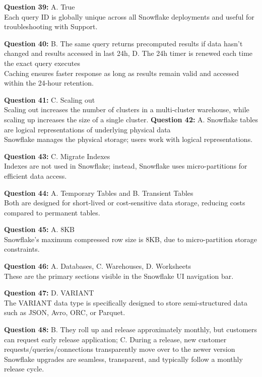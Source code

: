 \documentclass[12pt]{article}
\begin{document}
\textbf{Question 39:} A. True \\
Each query ID is globally unique across all Snowflake deployments and useful for troubleshooting with Support.

\textbf{Question 40:} B. The same query returns precomputed results if data hasn’t changed and results accessed in last 24h, 
D. The 24h timer is renewed each time the exact query executes \\
Caching ensures faster response as long as results remain valid and accessed within the 24-hour retention.

\textbf{Question 41:} C. Scaling out \\
Scaling out increases the number of clusters in a multi-cluster warehouse, while scaling up increases the size of a single cluster.
\textbf{Question 42:} A. Snowflake tables are logical representations of underlying physical data \\
Snowflake manages the physical storage; users work with logical representations.

\textbf{Question 43:} C. Migrate Indexes \\
Indexes are not used in Snowflake; instead, Snowflake uses micro-partitions for efficient data access.

\textbf{Question 44:} A. Temporary Tables and B. Transient Tables \\
Both are designed for short-lived or cost-sensitive data storage, reducing costs compared to permanent tables.

\textbf{Question 45:} A. 8KB \\
Snowflake’s maximum compressed row size is 8KB, due to micro-partition storage constraints.

\textbf{Question 46:} A. Databases, C. Warehouses, D. Worksheets \\
These are the primary sections visible in the Snowflake UI navigation bar.

\textbf{Question 47:} D. VARIANT \\
The VARIANT data type is specifically designed to store semi-structured data such as JSON, Avro, ORC, or Parquet.

\textbf{Question 48:} B. They roll up and release approximately monthly, but customers can request early release application; C. During a release, new customer requests/queries/connections transparently move over to the newer version \\
Snowflake upgrades are seamless, transparent, and typically follow a monthly release cycle.
\end{document}
